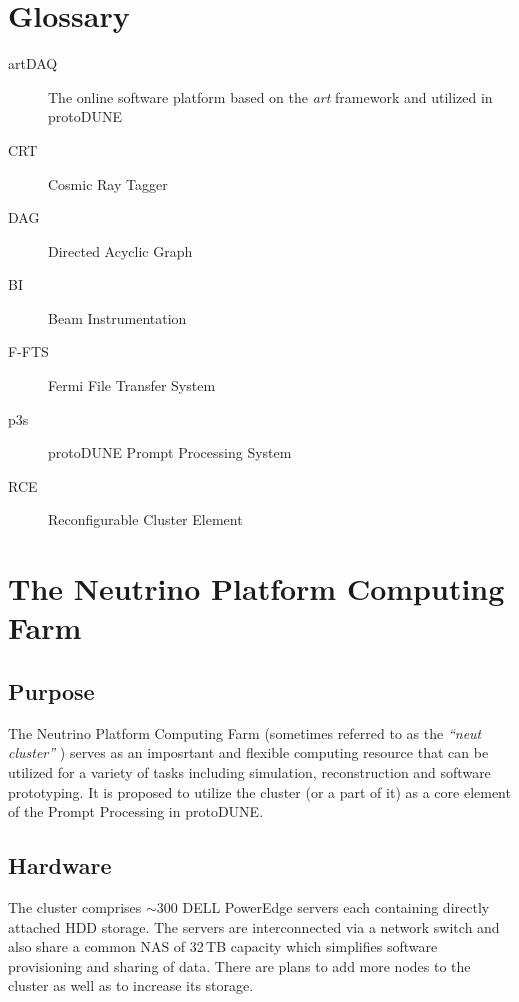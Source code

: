 \documentclass[pdftex,12pt,letter]{article}
\newcommand{\pd}{protoDUNE\xspace}
\begin{document}
\newpage
\appendix
\section{Glossary}
\begin{description}

\item [artDAQ] The online software platform based on the \textit{art} framework and utilized in \pd

\item [CRT] Cosmic Ray Tagger

\item [DAG] Directed Acyclic Graph

\item [BI] Beam Instrumentation

\item [F-FTS] Fermi File Transfer System

\item [p3s] \pd Prompt Processing System

\item [RCE] Reconfigurable Cluster Element

\end{description}

\section{The Neutrino Platform Computing Farm}
\label{appendix:neut}
\subsection{Purpose}
The Neutrino Platform Computing Farm (sometimes referred to as the \textit{``neut cluster''} \cite{neut})
serves as an imposrtant and flexible computing resource that can be utilized for a variety of tasks including simulation,
reconstruction and software prototyping. It is proposed to utilize the cluster (or a part of it) as a core element
of the Prompt Processing in \pd.

\subsection{Hardware}
The cluster comprises $\sim$300 DELL PowerEdge servers each containing directly attached HDD storage.
The servers are interconnected via a network switch and
also share a common NAS of 32\,TB capacity which simplifies software provisioning and
sharing of data. There are plans to add more nodes to the cluster as well as to increase
its storage.
\end{document}
